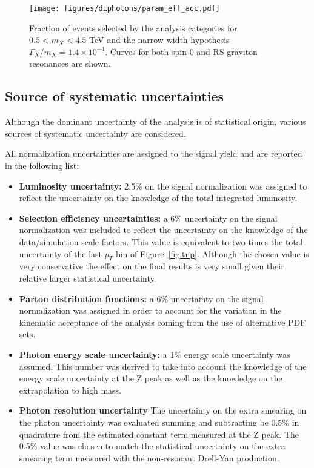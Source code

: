 \begin{figure}[!h]
  \centering
  \texttt{[image: figures/diphotons/param\_eff\_acc.pdf]}
  \caption{Fraction of events selected by the analysis categories for
    $0.5 < m_X < 4.5$ TeV and the narrow width hypothesis $\Gamma_X/m_X = 1.4\times 10^{-4}$.
    Curves for both spin-0 and RS-graviton resonances are shown.}
  \label{fig:eff_times_acc}
\end{figure}

\clearpage
\subsection{Source of systematic uncertainties}
\label{sec:syst}
Although the dominant uncertainty of the analysis is of statistical origin, various sources of systematic
uncertainty are considered.

All normalization uncertainties are assigned to the signal yield and are
reported in the following list:

\begin{itemize}
\item {\bf Luminosity uncertainty:} 2.5\% on the signal normalization was assigned to
    reflect the uncertainty on the knowledge of the total integrated luminosity.
\item {\bf Selection efficiency uncertainties:} a 6\% uncertainty on the signal
    normalization was included to reflect the uncertainty on the knowledge of the
    data/simulation scale factors. This value is equivalent to two times the total uncertainty of the last $p_T$ bin of
    Figure~\ref{fig:tnp}. Although the chosen value is very conservative the effect on the final results is very
    small given their relative larger statistical uncertainty.
\item {\bf Parton distribution functions: } a 6\% uncertainty on the signal normalization
    was assigned in order to account for the variation in the kinematic acceptance of the
    analysis coming from the use of alternative PDF sets.
\item {\bf Photon energy scale uncertainty:} a 1\% energy scale uncertainty was assumed. 
    This number was derived to take into account the knowledge of the energy scale uncertainty at the Z peak as well 
    as the knowledge on the extrapolation to high mass.
\item {\bf Photon resolution uncertainty} The uncertainty on the extra smearing on the
    photon uncertainty was evaluated summing and subtracting be 0.5\% in quadrature from
    the estimated constant term measured at the Z peak. The 0.5\% value was chosen to
    match the statistical uncertainty on the extra smearing term measured with the
    non-resonant Drell-Yan production.
\end{itemize}

